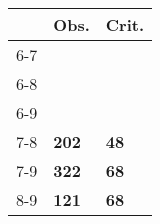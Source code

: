 \begin{table}[ht]
\centering
\begin{tabular}{rll}
  \hline
 & Obs. & Crit. \\ 
  \hline
6-7 &  &  \\ 
  6-8 &  &  \\ 
  6-9 &  &  \\ 
  7-8 & \textbf{202} & \textbf{48} \\ 
  7-9 & \textbf{322} & \textbf{68} \\ 
  8-9 & \textbf{121} & \textbf{68} \\ 
   \hline
\end{tabular}
\end{table}
